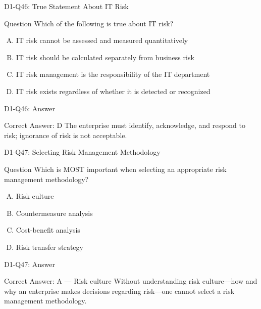 \documentclass{beamer}
\begin{document}
	\begin{frame}{D1-Q46: True Statement About IT Risk}
		\begin{block}{Question}
			Which of the following is true about IT risk?
		\end{block}
		\begin{enumerate}[(A)]
			\item IT risk cannot be assessed and measured quantitatively
			\item IT risk should be calculated separately from business risk
			\item IT risk management is the responsibility of the IT department
			\item IT risk exists regardless of whether it is detected or recognized
		\end{enumerate}
	\end{frame}
	\begin{frame}{D1-Q46: Answer}
		\begin{block}{Correct Answer: D}
			The enterprise must identify, acknowledge, and respond to risk; ignorance of risk is not acceptable.
		\end{block}
	\end{frame}
	
	\begin{frame}{D1-Q47: Selecting Risk Management Methodology}
		\begin{block}{Question}
			Which is MOST important when selecting an appropriate risk management methodology?
		\end{block}
		\begin{enumerate}[(A)]
			\item Risk culture
			\item Countermeasure analysis
			\item Cost-benefit analysis
			\item Risk transfer strategy
		\end{enumerate}
	\end{frame}
	\begin{frame}{D1-Q47: Answer}
		\begin{block}{Correct Answer: A --- Risk culture}
			Without understanding risk culture---how and why an enterprise makes decisions regarding risk---one cannot select a risk management methodology.
		\end{block}
	\end{frame}
	
\end{document}
